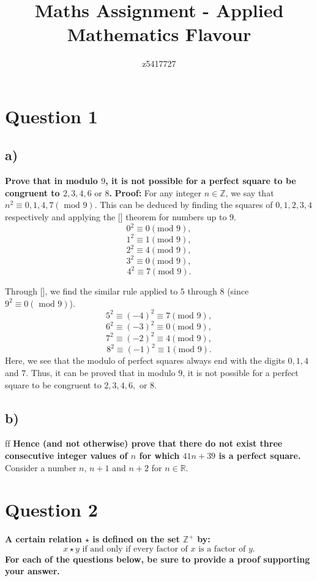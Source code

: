 \documentclass{article}
\title{Maths Assignment - Applied Mathematics Flavour}
\author{z5417727}
\begin{document}
\maketitle
{\LARGE \tableofcontents}
\newpage
\section{Question 1}
\subsection{a)}
\textbf{ Prove that in modulo $9$, it is not possible for a perfect square to be congruent to $2, 3, 4, 6 \text{ or } 8$.}
\textbf{ Proof: } For any integer $n \in \mathbb{Z}$, we say that $n^2 \equiv 0, 1, 4, 7 (\text{ mod } 9).$ 
\newline
\newline
This can be deduced by finding the squares of $0, 1, 2, 3, 4$ respectively and applying the [] theorem for numbers up to $9$.
$$0^2 \equiv 0 (\text{mod }9),$$
$$1^2 \equiv 1 (\text{mod }9),$$
$$2^2 \equiv 4 (\text{mod }9),$$
$$3^2 \equiv 0 (\text{mod }9),$$
$$4^2 \equiv 7 (\text{mod }9).$$

Through [], we find the similar rule applied to $5$ through $8$ (since $9^2 \equiv 0 (\text{ mod } 9)$).
$$5^2 \equiv (-4)^2 \equiv 7 (\text{mod }9),$$
$$6^2 \equiv (-3)^2 \equiv 0 (\text{mod }9),$$
$$7^2 \equiv (-2)^2 \equiv 4 (\text{mod }9),$$
$$8^2 \equiv (-1)^2 \equiv 1 (\text{mod }9).$$
Here, we see that the modulo of perfect squares always end with the digits $0, 1, 4$ and $7$. Thus, it can be proved that in modulo $9$, it is not possible for a perfect square to be congruent to $2, 3, 4, 6, \text{ or } 8$.
\newpage
\subsection{b)}ƒƒ
\textbf{ Hence (and not otherwise) prove that there do not exist three consecutive integer values of $n$ for which $41n + 39$ is a perfect square. }
Consider a number $n$, $n + 1$ and $n + 2$ for $n \in \mathbb{R}$.
\section{Question 2}
\textbf{ A certain relation $\star$ is defined on the set $\mathbb{Z}^+$ by:
\newline
$$x \star y \text{ if and only if every factor of } x \text{ is a factor of } y.$$
For each of the questions below, be sure to provide a proof supporting your answer. }
\end{document}
